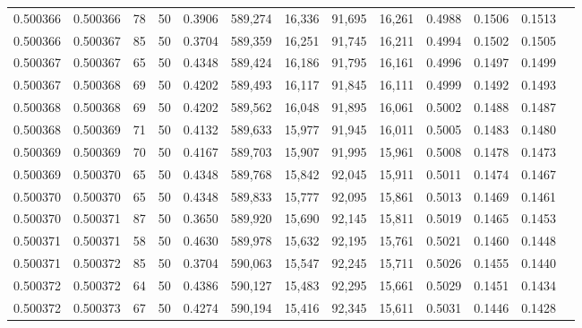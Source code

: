 \begin{tabular}{rrrrrrrrrrrrr}
0.500366 & 0.500366 &    78 &  50 &                                     0.3906 & 589,274 &  16,336 &  91,695 &  16,261 & 0.4988 & 0.1506 & 0.1513 \\
0.500366 & 0.500367 &    85 &  50 &                                     0.3704 & 589,359 &  16,251 &  91,745 &  16,211 & 0.4994 & 0.1502 & 0.1505 \\
0.500367 & 0.500367 &    65 &  50 &                                     0.4348 & 589,424 &  16,186 &  91,795 &  16,161 & 0.4996 & 0.1497 & 0.1499 \\
0.500367 & 0.500368 &    69 &  50 &                                     0.4202 & 589,493 &  16,117 &  91,845 &  16,111 & 0.4999 & 0.1492 & 0.1493 \\
0.500368 & 0.500368 &    69 &  50 &                                     0.4202 & 589,562 &  16,048 &  91,895 &  16,061 & 0.5002 & 0.1488 & 0.1487 \\
0.500368 & 0.500369 &    71 &  50 &                                     0.4132 & 589,633 &  15,977 &  91,945 &  16,011 & 0.5005 & 0.1483 & 0.1480 \\
0.500369 & 0.500369 &    70 &  50 &                                     0.4167 & 589,703 &  15,907 &  91,995 &  15,961 & 0.5008 & 0.1478 & 0.1473 \\
0.500369 & 0.500370 &    65 &  50 &                                     0.4348 & 589,768 &  15,842 &  92,045 &  15,911 & 0.5011 & 0.1474 & 0.1467 \\
0.500370 & 0.500370 &    65 &  50 &                                     0.4348 & 589,833 &  15,777 &  92,095 &  15,861 & 0.5013 & 0.1469 & 0.1461 \\
0.500370 & 0.500371 &    87 &  50 &                                     0.3650 & 589,920 &  15,690 &  92,145 &  15,811 & 0.5019 & 0.1465 & 0.1453 \\
0.500371 & 0.500371 &    58 &  50 &                                     0.4630 & 589,978 &  15,632 &  92,195 &  15,761 & 0.5021 & 0.1460 & 0.1448 \\
0.500371 & 0.500372 &    85 &  50 &                                     0.3704 & 590,063 &  15,547 &  92,245 &  15,711 & 0.5026 & 0.1455 & 0.1440 \\
0.500372 & 0.500372 &    64 &  50 &                                     0.4386 & 590,127 &  15,483 &  92,295 &  15,661 & 0.5029 & 0.1451 & 0.1434 \\
0.500372 & 0.500373 &    67 &  50 &                                     0.4274 & 590,194 &  15,416 &  92,345 &  15,611 & 0.5031 & 0.1446 & 0.1428 \\

\end{tabular}

